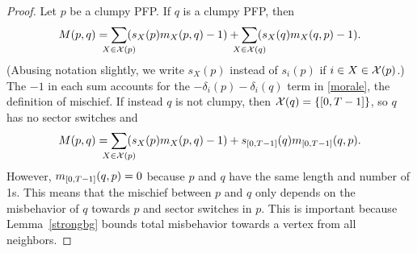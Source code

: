 \begin{proof}
Let $p$ be a clumpy PFP. If $q$ is a clumpy PFP, then
\begin{equation}\label{misbSub1}
  M(p,q) =
  \smashoperator{\sum_{X \in \sctr{p}}}(s_X(p)\misb{X}{p}{q} - 1) +
  \smashoperator{\sum_{X \in \sctr{q}}}(s_X(q)\misb{X}{q}{p} - 1).
\end{equation}
(Abusing notation slightly, we write $s_X(p)$ instead of $s_i(p)$ if $i \in X
\in \mathcal{X}(p)$.) The $-1$ in each sum accounts for the
$-\delta_i(p)-\delta_i(q)$ term in \eqref{morale}, the definition of
mischief. If instead $q$ is not clumpy, then $\sctr{q} = \{[0,\period-1]\}$, so
$q$ has no sector switches and
\begin{equation}\label{misbSub2}
  M(p,q) =
  \smashoperator{\sum_{X \in \sctr{p}}}(s_X(p)\misb{X}{p}{q} - 1) +
  s_{[0,\period-1]}(q)\misb{[0,\period-1]}{q}{p}.
\end{equation}
However, $\misb{[0,\period-1]}{q}{p} = 0$ because $p$ and $q$ have the same
length and number of 1s. This means that the mischief between $p$ and $q$ only
depends on the misbehavior of $q$ towards $p$ and sector switches in $p$. This
is important because Lemma~\ref{strongbg} bounds total misbehavior towards a
vertex from all neighbors.


\end{proof}
